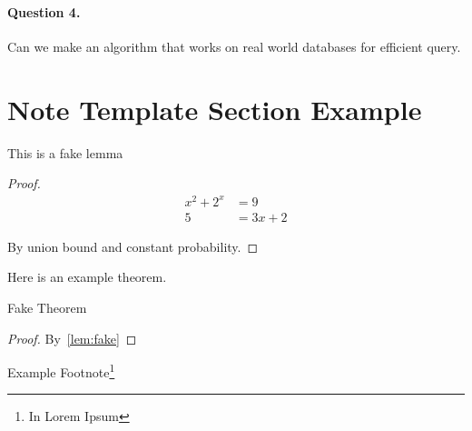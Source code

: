 \documentclass[12pt]{article}
\begin{document}
\paragraph{Question 4.} Can we make an algorithm that works on real world databases for efficient query.

\section{Note Template Section Example}

\begin{lemma}\label{lem:fake}
	This is a fake lemma
\end{lemma}

\begin{proof}
	\begin{align*}
		x^{2} + 2^{x} & = 9      \\
		5             & = 3x + 2
	\end{align*}

	By union bound and constant probability.
\end{proof}

Here is an example theorem.

\begin{theorem}\label{thm:fake}
	Fake Theorem
\end{theorem}

\begin{proof}
	By~\cref{lem:fake}
\end{proof}

Example Footnote\footnote{In Lorem Ipsum}
\end{document}
